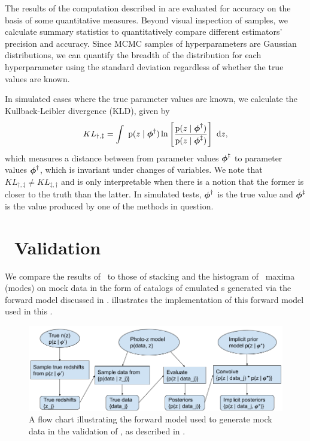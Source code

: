 The results of the computation described in  are evaluated for accuracy on the basis of some quantitative measures.  
Beyond visual inspection of samples, we calculate summary statistics to quantitatively compare different estimators' precision and accuracy.  
Since MCMC samples of hyperparameters are Gaussian distributions, we can quantify the breadth of the distribution for each hyperparameter using the standard deviation regardless of whether the true values are known.  

In simulated cases where the true parameter values are known, we calculate the Kullback-Leibler divergence (KLD), given by 
\begin{equation}
\eqlabel{eq:kl}
KL_{\dagger,\ddagger} = \integral{\pr{z \gvn \ndphi^{\dagger}} \ln \left[ \frac{\pr{z \gvn \ndphi^{\dagger}}}{\pr{z \gvn \ndphi^{\ddagger}}} \right]}{z} ,
\end{equation}
which measures a distance between from parameter values ${\boldsymbol{\phi}}^{\ddagger}$ to parameter values ${\boldsymbol{\phi}}^{\dagger}$, which is invariant under changes of variables.  
We note that $KL_{\dagger,\ddagger} \neq KL_{\ddagger,\dagger}$ and is only interpretable when there is a notion that the former is closer to the truth than the latter.
In simulated tests, ${\boldsymbol{\phi}}^{\dagger}$ is the true value and ${\boldsymbol{\phi}}^{\ddagger}$ is the value produced by one of the methods in question.  

\section{\chippr\ Validation}

We compare the results of \Chippr\ to those of stacking and the histogram of \pzpdf\ maxima (modes) on mock data in the form of catalogs of emulated \pzpdf s generated via the forward model discussed in .
 illustrates the implementation of this forward model used in this \paper.

\begin{figure}
	\begin{center}
		\includegraphics[width=\textwidth]{figures/chippr/flowchart.png}
		\caption{A flow chart illustrating the forward model used to generate mock data in the validation of \Chippr, as described in .}
	\end{center}
\end{figure}

